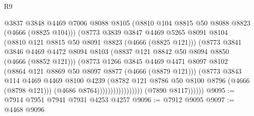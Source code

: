 \begin{lexlean}{R9}
\begin{coremodule}
                                      @3837
                                      @3848
                                      @4469
                                      @7006
                                      @8088
                                      @8105
                                      (@8810 @104 @8815 @50 @8088 @8823 (@4666 (@8825 @104)))
                                      (@8773
                                        @3839
                                        @3847
                                        @4469
                                        @5265
                                        @8091
                                        @8104
                                        (@8810 @121 @8815 @50 @8091 @8823 (@4666 (@8825 @121)))
                                        (@8773
                                          @3841
                                          @3846
                                          @4469
                                          @4472
                                          @8094
                                          @8103
                                          (@8837 @121 @8842 @50 @8094 @8850 (@4666 (@8852 @121)))
                                          (@8773
                                            @1266
                                            @3845
                                            @4469
                                            @4471
                                            @8097
                                            @8102
                                            (@8864 @121 @8869 @50 @8097 @8877 (@4666 (@8879 @121)))
                                            (@8773
                                              @3843
                                              @114
                                              @4469
                                              @4469
                                              @8100
                                              @4239
                                              (@8782
                                                @121
                                                @8786
                                                @50
                                                @8100
                                                @8796
                                                (@4666 (@8798 @121)))
                                              (@4686 @8764)))))))))))))))))
              (@7890 @8117))))))
@9095 := @7914 @7951 @7941 @7931 @4253 @4257
@9096 := @7912 @9095
@9097 := @4468 @9096

\end{coremodule}
\end{lexlean}
